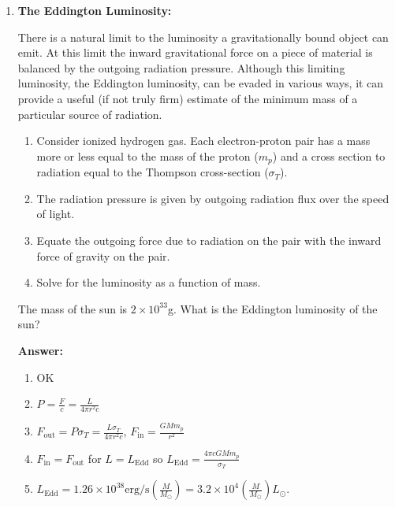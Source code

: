 \documentclass{article}
\begin{document}
\begin{enumerate}
\item{\bf The Eddington Luminosity:} 

  There is a natural limit to the luminosity a gravitationally bound
  object can emit. At this limit the inward gravitational force on a
  piece of material is balanced by the outgoing radiation
  pressure. Although this limiting luminosity, the Eddington
  luminosity, can be evaded in various ways, it can provide a useful
  (if not truly firm) estimate of the minimum mass of a particular
  source of radiation.

\begin{enumerate}
\item Consider ionized hydrogen gas. Each electron-proton pair has a
  mass more or less equal to the mass of the proton ($m_p$) and a cross
  section to radiation equal to the Thompson cross-section ($\sigma_T$).
\item The radiation pressure is given by outgoing radiation flux over the speed of light.
\item Equate the outgoing force due to radiation on the pair with the inward force of gravity on the pair.
\item Solve for the luminosity as a function of mass.
\end{enumerate}
The mass of the sun is $2 \times 10^{33}$g. What is the Eddington
luminosity of the sun?

{\bf Answer:}
\begin{enumerate}
\item OK
\item $P=\frac{F}{c} = \frac{L}{4\pi r^2 c}$
\item $F_\mathrm{out} = P \sigma_T = \frac{L \sigma_T}{4\pi r^2 c}$,
  $F_\mathrm{in} = \frac{G M m_p}{r^2}$
\item
  $F_\mathrm{in}=F_\mathrm{out}$ for $L=L_\mathrm{Edd}$ so
  $L_\mathrm{Edd} = \frac{4\pi c G M m_p}{\sigma_T}$
\item
  $L_\mathrm{Edd} = 1.26 \times 10^{38} \textrm{erg/s} \left (\frac{M}{M_\odot}
  \right ) = 3.2 \times 10^4 \left (\frac{M}{M_\odot}
  \right ) L_\odot.$
\end{enumerate}
\end{enumerate}


\ifx\bookloaded\undefined
\end{document}
